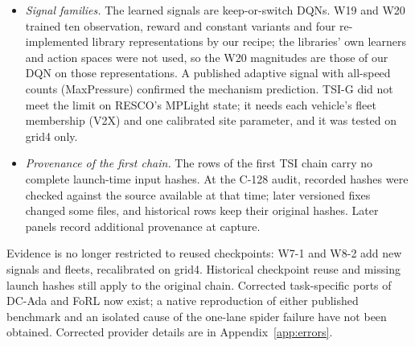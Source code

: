 \begin{itemize}
separate action predictor; it converged to
minimum-length greens. A control at forecast penalty 0 shows that at the port's reward scale the penalty caused the collapse; at the
authors' scale the control also collapsed on 2 of 5 seeds and both PPO arms were 4--5\,s/veh worse than the DQN signal, so the port's
PPO recipe, not FoRL's penalty, limits signal quality; a better-tuned FoRL signal was not obtained. Neither port is a native reproduction of the published benchmark. Statistical and supervised SPaT predictors appear as service-only arms. CoTV, HONEST-CAV and DHCP were not reproduced. W8-2 does not establish fuel non-inferiority to retraining for the original design (upper $+0.728\%$ versus margin $+0.5\%$), despite lower
city and agent time losses; wave 13 establishes it, with a bound below zero, for the quantile-calibrated design against the same F1-B recipe
on one panel, and wave 14 on a second (TSI-2). A stronger retraining recipe (longer training, other algorithms) was not tried.
\item \emph{Signal families.} The learned signals are keep-or-switch DQNs. W19 and W20 trained ten observation, reward and constant
variants and four re-implemented library representations by our recipe; the libraries' own learners and action spaces were not used, so
the W20 magnitudes are those of our DQN on those representations. A published adaptive signal with all-speed counts (MaxPressure)
confirmed the mechanism prediction. TSI-G did not meet the limit on RESCO's MPLight state; it needs each vehicle's fleet membership (V2X)
and one calibrated site parameter, and it was tested on grid4 only.
\item \emph{Provenance of the first chain.} The rows of the first TSI chain carry no complete launch-time input hashes. At the C-128
audit, recorded hashes were checked against the source available at that time; later versioned fixes changed some files, and historical
rows keep their original hashes. Later panels record additional provenance at capture.
\end{itemize}
Evidence is no longer restricted to reused checkpoints: W7-1 and W8-2 add new signals and fleets, recalibrated on grid4. Historical checkpoint reuse and missing launch hashes still apply to the original chain. Corrected task-specific ports of DC-Ada and FoRL now exist; a native reproduction of either published benchmark and an isolated cause of
the one-lane spider failure have not been obtained. Corrected provider details are in Appendix~\ref{app:errors}.

